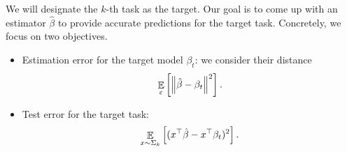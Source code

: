 We will designate the $k$-th task as the target.
Our goal is to come up with an estimator $\hat{\beta}$ to provide accurate predictions for the target task.
Concretely, we focus on two objectives.
\begin{itemize}
	\item Estimation error for the target model $\beta_t$: we consider their distance
		\[ \mathop{\mathbb{E}}_{\varepsilon}\left[ \left\| \hat{\beta} - \beta_t \right\|^2 \right]. \]
	\item Test error for the target task:
		\[ \mathop{\mathbb{E}}_{x \sim \Sigma_k}\left[ (x^{\top}\hat{\beta} - x^{\top}\beta_t)^2 \right]. \]
\end{itemize}


